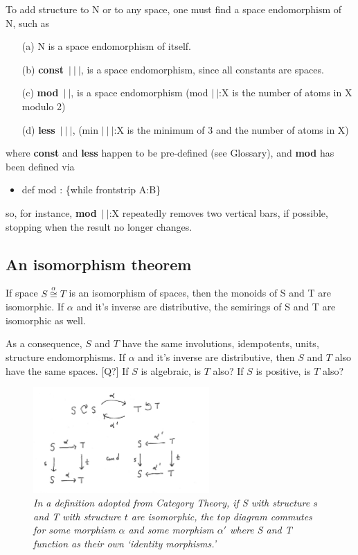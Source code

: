 \documentclass[11pt]{article}
\begin{document}
    To add structure to N or to any space, one must find a space endomorphism of N, such as 
\begin{itemize}
\item[(a)]{N is a space endomorphism of itself.}
\item[(b)]{{\bf const}\ $\vert\ \vert\ \vert$, is a space endomorphism, since all constants are spaces.}
\item[(c)]{{\bf mod}\ $\vert\ \vert$, is a space endomorphism (mod $\vert\ \vert$:X is the number of atoms in X modulo 2)}
\item[(d)]{{\bf less}\ $\vert\ \vert\ \vert$, (min $\vert\ \vert\ \vert$:X is the minimum of 3 and the number of atoms in X)} 
\end{itemize}
where {\bf const} and {\bf less} happen to be pre-defined (see Glossary), and {\bf mod} has been defined via 
\begin{itemize}
\item{}def mod : \{while frontstrip A:B\} 
\end{itemize}
so, for instance, {\bf mod}\ $\vert\ \vert$:X repeatedly removes two vertical bars, if possible, stopping when the result no longer changes. 

\subsection{An isomorphism theorem}

\begin{fact}  If space $S{\overset \alpha \cong}T$ is an isomorphism of spaces, then the monoids of S and T are isomorphic.  
If $\alpha$ and it's inverse are distributive, the semirings of S and T are isomorphic as well. 
\end{fact}

As a consequence, $S$ and $T$ have the same involutions, idempotents, units, structure endomorphisms.  If $\alpha$ and it's inverse are distributive, then $S$ and $T$ also have the same spaces.  [Q?] If $S$ is algebraic, is $T$ also?  If $S$ is positive, is $T$ also?

\begin{figure}[h]
\centering
\includegraphics[width=0.6\textwidth]{isomorphism.png}
\caption{{\it In a definition adopted from Category Theory, if S with structure $s$ and T with structure $t$ are isomorphic, the top diagram commutes for some morphism $\alpha$ and some morphism $\alpha'$ where S and T function as their own `identity morphisms.' }}
\end{figure}
\end{document}
